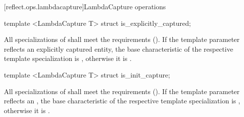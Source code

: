 [reflect.ops.lambdacapture]{LambdaCapture operations}
\begin{std.txt}\color{addclr}
\begin{itemdecl}
template <LambdaCapture T> struct is_explicitly_captured;
\end{itemdecl}
\begin{itemdescr}
\pnum
      All specializations of  shall meet the
       requirements (). If the template
      parameter reflects an explicitly captured entity, the base characteristic
      of the respective template specialization is , otherwise
      it is .
\end{itemdescr}

\begin{itemdecl}
template <LambdaCapture T> struct is_init_capture;
\end{itemdecl}
\begin{itemdescr}
\pnum
      All specializations of  shall meet the
       requirements (). If the template
      parameter reflects an , the base characteristic
      of the respective template specialization is , otherwise
      it is .
\end{itemdescr}
\end{std.txt}
